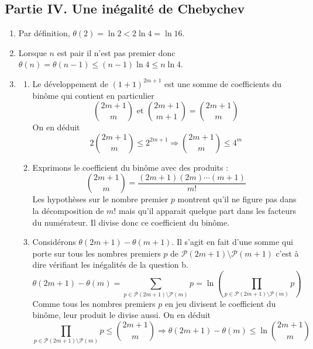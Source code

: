 \subsection*{Partie IV. Une inégalité de Chebychev}
\begin{enumerate}
 \item Par définition, $\theta(2)=\ln 2 < 2\ln 4 = \ln 16$.
 \item Lorsque $n$ est pair il n'est pas premier donc $\theta(n)=\theta(n-1)\leq (n-1)\ln 4 \leq n\ln 4 $.
 \item \begin{enumerate}
 \item Le développement de $(1+1)^{2m+1}$ est une somme de coefficients du binôme qui contient en particulier
\begin{displaymath}
 \binom{2m+1}{m} \text{ et }  \binom{2m+1}{m+1}=\binom{2m+1}{m}  
\end{displaymath}
On en déduit
\begin{displaymath}
 2\binom{2m+1}{m} \leq 2^{2m+1} \Rightarrow \binom{2m+1}{m}\leq 4^m
\end{displaymath}
\item Exprimons le coefficient du binôme avec des produits :
\begin{displaymath}
 \binom{2m+1}{m} = \frac{(2m+1)(2m)\cdots (m+1)}{m!}
\end{displaymath}
Les hypothèses sur le nombre premier $p$ montrent qu'il ne figure pas dans la décomposition de $m!$ mais qu'il apparait quelque part dans les facteurs du numérateur. Il divise donc ce coefficient du binôme.
\item Considérons $\theta(2m+1)-\theta(m+1)$. Il s'agit en fait d'une somme qui porte sur tous les nombres premiers $p$ de $\mathcal P(2m+1)\setminus \mathcal P(m+1)$ c'est à dire vérifiant les inégalités de la question b.
\begin{displaymath}
 \theta(2m+1)-\theta(m) = \sum_{p\in \mathcal P(2m+1)\setminus \mathcal P(m)}p
=\ln\left( \prod_{p\in \mathcal P(2m+1)\setminus \mathcal P(m)}p\right) 
\end{displaymath}
Comme tous les nombres premiers $p$ en jeu divisent le coefficient du binôme, leur produit le divise aussi. On en déduit
\begin{displaymath}
 \prod_{p\in \mathcal P(2m+1)\setminus \mathcal P(m)}p \leq \binom{2m+1}{m}
\Rightarrow
\theta(2m+1)-\theta(m) \leq \ln \binom{2m+1}{m}
\end{displaymath}
 
\end{enumerate}


\end{enumerate}

